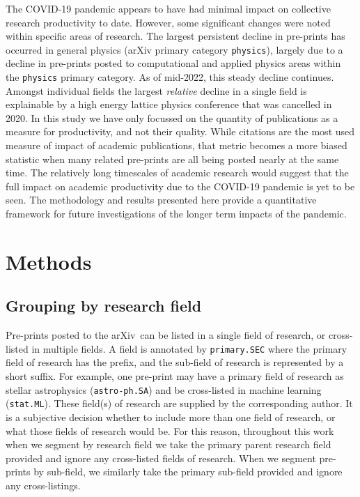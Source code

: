 \documentclass[]{rsos}%
\newcommand{\arxiv}{arXiv}
\begin{document}
The COVID-19 pandemic appears to have had minimal impact on collective research productivity to date.
However, some significant changes were noted within specific areas of research. The largest persistent decline in pre-prints has occurred in {general physics (arXiv primary category \texttt{physics}), largely due to a decline in  pre-prints posted to computational and applied physics areas within the \texttt{physics} primary category. As of mid-2022, this steady decline continues.} Amongst individual fields the largest \emph{relative} decline in a single field is explainable by a high energy lattice physics conference that was cancelled in 2020. In this study we have only focussed on the quantity of publications as a measure for productivity, and not their quality. While citations are the most used measure of impact of academic publications, that metric becomes a more biased statistic when many related pre-prints are all being posted nearly at the same time\cite{Fassin:2021}. The relatively long timescales of academic research would suggest that the full impact on academic productivity due to the COVID-19 pandemic is yet to be seen. The methodology and results presented here provide a quantitative framework for future investigations of the longer term impacts of the pandemic.


\section*{Methods}

\subsection*{Grouping by research field}

Pre-prints posted to the \arxiv\ can be listed in a single field of research, or cross-listed in multiple fields. A field is annotated by \texttt{primary.SEC} where the primary field of research has the prefix, and the sub-field of research is represented by a short suffix. For example, one pre-print may have a primary field of research as stellar astrophysics (\texttt{astro-ph.SA}) and be cross-listed in machine learning (\texttt{stat.ML}). These field(s) of research are supplied by the corresponding author. It is a subjective decision whether to include more than one field of research, or what those fields of research would be. For this reason, throughout this work when we segment by research field we take the primary parent research field provided and ignore any cross-listed fields of research. When we segment pre-prints by sub-field, we similarly take the primary sub-field provided and ignore any cross-listings.
\end{document}
